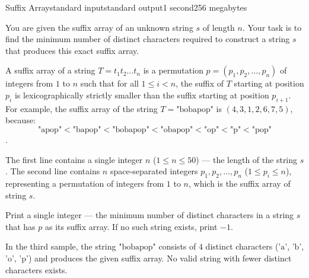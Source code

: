 \begin{problem}{Suffix Array}{standard input}{standard output}{1 second}{256 megabytes}

You are given the suffix array of an unknown string $s$ of length $n$. 
Your task is to find the minimum number of distinct characters required to construct a string $s$ that produces this exact suffix array.

A suffix array of a string $T = t_1 t_2 \dots t_n$ is a permutation $p = (p_1, p_2, \dots, p_n)$ of integers from $1$ to $n$ such that for all $1 \le i < n$, the suffix of $T$ starting at position $p_i$ is lexicographically strictly smaller than the suffix starting at position $p_{i+1}$.
For example, the suffix array of the string $T = \text{"bobapop"}$ is $(4, 3, 1, 2, 6, 7, 5)$, because:$$\text{"apop"} < \text{"bapop"} < \text{"bobapop"} < \text{"obapop"} < \text{"op"} < \text{"p"} < \text{"pop"}$$.

\InputFile
The first line contains a single integer $n$ ($1 \le n \le 50$) --- the length of the string $s$.
The second line contains $n$ space-separated integers $p_1, p_2, \dots, p_n$ ($1 \le p_i \le n$), representing a permutation of integers from $1$ to $n$, which is the suffix array of string $s$.

\OutputFile
Print a single integer --- the minimum number of distinct characters in a string $s$ that has $p$ as its suffix array. If no such string exists, print $-1$.

\Examples

\begin{example}
%
%
%
\end{example}

\Note
In the third sample, the string $\text{"bobapop"}$ consists of $4$ distinct characters ($\text{'a'}$, $\text{'b'}$, $\text{'o'}$, $\text{'p'}$) and produces the given suffix array. 
No valid string with fewer distinct characters exists.

\end{problem}

